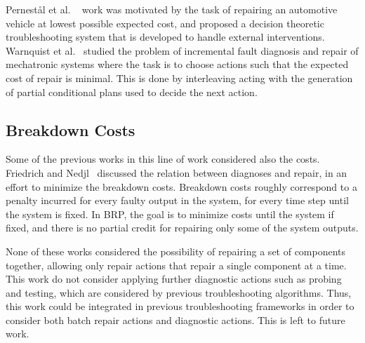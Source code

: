 \documentclass[a4paper,11pt]{report}
\newcommand\roni[1]{\textcolor{green}{roni: #1}}
\begin{document}
Pernest{\aa}l et al. ~\cite{Nyberg12} work was motivated by the task of repairing an automotive vehicle at lowest possible expected cost, and proposed a decision theoretic troubleshooting system that is developed to handle external interventions. Warnquist et al.~\cite{warnquist2009planning} studied the problem of incremental fault diagnosis and repair of mechatronic systems where the task is to choose actions such that the expected cost of repair is minimal. This is done by interleaving acting with the generation of partial conditional plans used to decide the next action.

\subsection{Breakdown Costs}
Some of the previous works in this line of work considered also the costs. Friedrich and Nedjl~\cite{friedrich1992choosing} discussed the relation between diagnoses and repair, in an effort to minimize the breakdown costs. Breakdown costs roughly correspond to a penalty incurred for every faulty output in the system, for every time step until the system is fixed. In BRP, the goal is to minimize costs until the system if fixed, and there is no partial credit for repairing only some of the system outputs.


None of these works considered the possibility of repairing a set of components together, allowing only repair actions that repair a single component at a time.
This work do not consider applying further diagnostic actions such as probing and testing, which are considered by previous troubleshooting algorithms. Thus, this work could be integrated in previous troubleshooting frameworks in order to consider both batch repair actions and diagnostic actions. This is left to future work.
\end{document}
